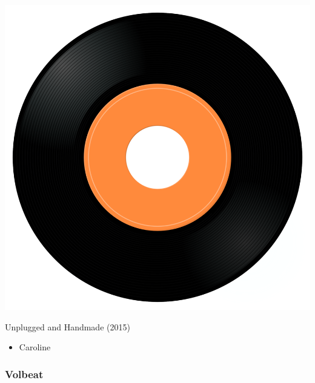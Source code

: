 \begin{minipage}[t]{0.25\textwidth}
\captionsetup{type=figure}
\includegraphics[width=\textwidth]{Images/cover.png}
\caption*{Unplugged and Handmade (2015)}
\end{minipage}
\begin{minipage}[t]{0.25\textwidth}\vspace{0pt}
\begin{itemize}[nosep,leftmargin=1em,labelwidth=*,align=left]
	\setlength{\itemsep}{0pt}
	\item Caroline
\end{itemize}
\end{minipage}

\subsubsection{Volbeat}

